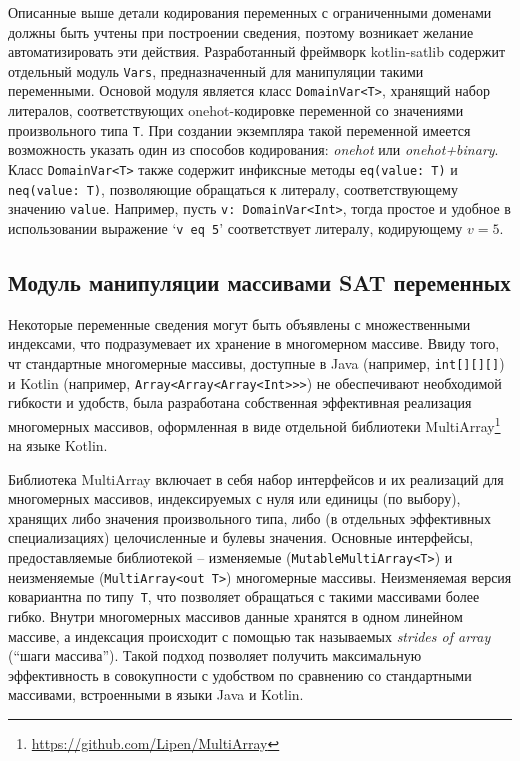 Описанные выше детали кодирования переменных с ограниченными доменами должны быть учтены при построении сведения, поэтому возникает желание автоматизировать эти действия.
Разработанный фреймворк kotlin-satlib содержит отдельный модуль \texttt{Vars}, предназначенный для манипуляции такими переменными.
Основой модуля является класс \texttt{DomainVar<T>}, хранящий набор литералов, соответствующих onehot-кодировке переменной со значениями произвольного типа \texttt{T}.
При создании экземпляра такой переменной имеется возможность указать один из способов кодирования: \textit{onehot} или \textit{onehot+binary}.
Класс \texttt{DomainVar<T>} также содержит инфиксные методы \texttt{eq(value:~T)} и \texttt{neq(value:~T)}, позволяющие обращаться к литералу, соответствующему значению \texttt{value}.
Например, пусть \texttt{v:~DomainVar<Int>}, тогда простое и удобное в использовании выражение `\texttt{v~eq~5}' соответствует литералу, кодирующему $v = 5$.

\subsection{Модуль манипуляции массивами SAT переменных}

Некоторые переменные сведения могут быть объявлены с множественными индексами, что подразумевает их хранение в многомерном массиве. Ввиду того, чт стандартные многомерные массивы, доступные в Java (например, \texttt{int[][][]}) и Kotlin (например, \texttt{Array<Array<Array<Int>>>}) не обеспечивают необходимой гибкости и удобств, была разработана собственная эффективная реализация многомерных массивов, оформленная в виде отдельной библиотеки MultiArray\footnote{\url{https://github.com/Lipen/MultiArray}} на языке Kotlin.

Библиотека MultiArray включает в себя набор интерфейсов и их реализаций для многомерных массивов, индексируемых с нуля или единицы (по выбору), хранящих либо значения произвольного типа, либо (в отдельных эффективных специализациях) целочисленные и булевы значения.
Основные интерфейсы, предоставляемые библиотекой \--- изменяемые (\texttt{Mutable\-Multi\-Array<T>}) и неизменяемые (\texttt{Multi\-Array<out~T>}) многомерные массивы.
Неизменяемая версия ковариантна по типу~\texttt{T}, что позволяет обращаться с такими массивами более гибко.
Внутри многомерных массивов данные хранятся в одном линейном массиве, а индексация происходит с помощью так называемых \textit{strides of array} (\enquote{шаги массива}).
Такой подход позволяет получить максимальную эффективность в совокупности с удобством по сравнению со стандартными массивами, встроенными в языки Java и Kotlin.


